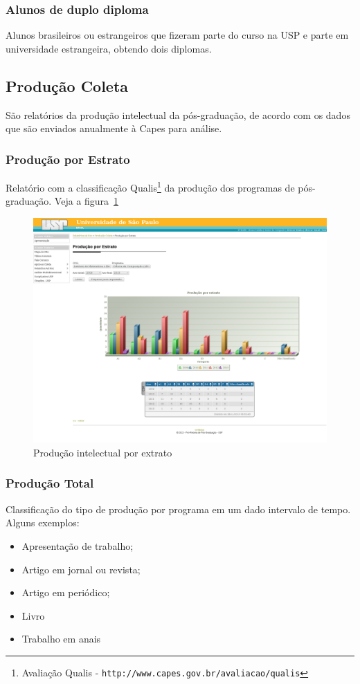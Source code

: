 \subsubsection{Alunos de duplo diploma}
Alunos brasileiros ou estrangeiros que fizeram parte do curso na USP e parte em universidade estrangeira, obtendo dois diplomas.

\subsection{Produção Coleta}
São relatórios da produção intelectual da pós-graduação, de acordo com os dados que são enviados anualmente à Capes para análise.

\subsubsection{Produção por Estrato}
\label{sub:pes}
Relatório com a classificação Qualis\footnote{Avaliação Qualis - \texttt{http://www.capes.gov.br/avaliacao/qualis}} da
produção dos programas de pós-graduação. Veja a figura~\ref{fig:qualis}

\begin{figure}[H]
    \includegraphics[width=\textwidth]{figuras/qualis.png}
    \caption{Produção intelectual por extrato}
    \label{fig:qualis}
\end{figure}
\vfill
\subsubsection{Produção Total}
\label{sub:ptot}
Classificação do tipo de produção por programa em um dado intervalo de tempo. Alguns exemplos:
\begin{itemize}
\item Apresentação de trabalho;
\item Artigo em jornal ou revista;
\item Artigo em periódico;
\item Livro
\item Trabalho em anais
\end{itemize}

